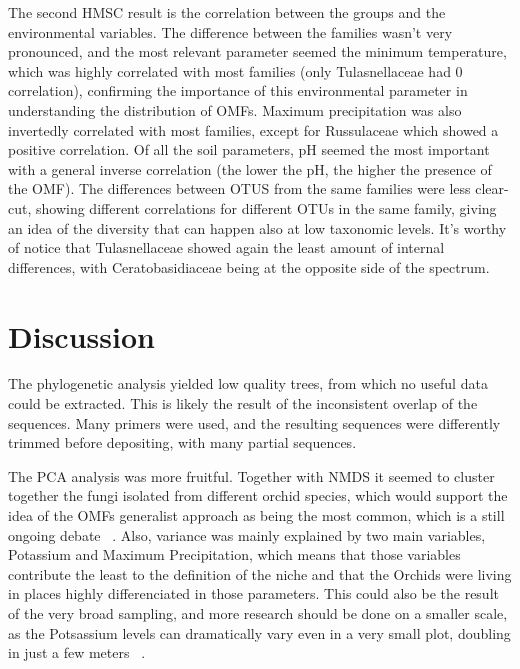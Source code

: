 The second HMSC result is the correlation between the groups and the environmental variables.
The difference between the families wasn't very pronounced, and the most relevant parameter seemed the minimum temperature, which was highly correlated with most families (only Tulasnellaceae had 0 correlation), confirming the importance of this environmental parameter in understanding the distribution of OMFs. Maximum precipitation was also invertedly correlated with most families, except for Russulaceae which showed a positive correlation. Of all the soil parameters, pH seemed the most important with a general inverse correlation (the lower the pH, the higher the presence of the OMF).
The differences between OTUS from the same families were less clear-cut, showing different correlations for different OTUs in the same family, giving an idea of the diversity that can happen also at low taxonomic levels.
It's worthy of notice that Tulasnellaceae showed again the least amount of internal differences, with Ceratobasidiaceae being at the opposite side of the spectrum.

\part{Discussion}
\label{discussion}

The phylogenetic analysis yielded low quality trees, from which no useful data could be extracted. This is likely the result of the inconsistent overlap of the sequences. Many primers were used, and the resulting sequences were differently trimmed before depositing, with many partial sequences.

The PCA analysis was more fruitful. Together with NMDS it seemed to cluster together the fungi isolated from different orchid species, which would support the idea of the OMFs generalist approach as being the most common, which is a still ongoing debate ~\citep{bailarote2012}. Also, variance was mainly explained by two main variables, Potassium and Maximum Precipitation, which means that those variables contribute the least to the definition of the niche and that the Orchids were living in places highly differenciated in those parameters. This could also be the result of the very broad sampling, and more research should be done on a smaller scale, as the Potsassium levels can dramatically vary even in a very small plot, doubling in just a few meters ~\citep{bogunovic2014}.

